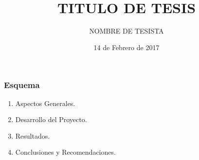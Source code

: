 \documentclass{beamer}
\title{TITULO DE TESIS}
\institute{FIEEIM - UNSAAC}
\author{NOMBRE DE TESISTA}
\date{14 de Febrero de 2017}%
\let\olditem=\item%
\renewcommand{\item}{\olditem \justifying}%
\begin{document}


\begin{frame}
   \frametitle{Esquema}
   \begin{enumerate}
      \item Aspectos Generales.
      \item Desarrollo del Proyecto.
      \item Resultados.
      \item Conclusiones y Recomendaciones.
   \end{enumerate}
\end{frame}


%








 
\end{document}
